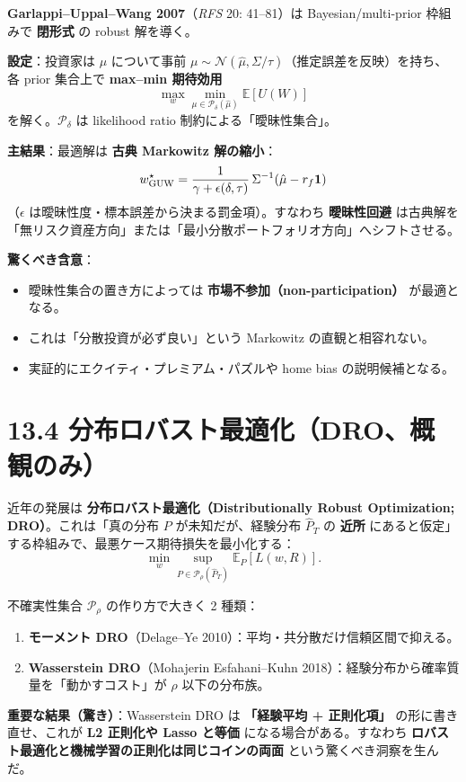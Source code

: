 \documentclass[11pt,a4paper]{report}
\begin{document}
\textbf{Garlappi–Uppal–Wang 2007}（\emph{RFS} 20: 41–81）は Bayesian/multi-prior 枠組みで \textbf{閉形式} の robust 解を導く。

\textbf{設定}：投資家は $\mu$ について事前 $\mu \sim \mathcal{N}(\hat\mu, \Sigma/\tau)$（推定誤差を反映）を持ち、各 prior 集合上で \textbf{max–min 期待効用} \[ \max_w \min_{\mu \in \mathcal{P}_\delta(\hat\mu)} \mathbb{E}[U(W)] \] を解く。$\mathcal{P}_\delta$ は likelihood ratio 制約による「曖昧性集合」。

\textbf{主結果}：最適解は \textbf{古典 Markowitz 解の縮小}： \[ w_{\rm GUW}^\star = \frac{1}{\gamma + \epsilon(\delta, \tau)}\, \Sigma^{-1}(\hat\mu - r_f \mathbf{1}) \] （$\epsilon$ は曖昧性度・標本誤差から決まる罰金項）。すなわち \textbf{曖昧性回避} は古典解を「無リスク資産方向」または「最小分散ポートフォリオ方向」へシフトさせる。

\textbf{驚くべき含意}：
\begin{itemize}
\item 曖昧性集合の置き方によっては \textbf{市場不参加（non-participation）} が最適となる。
\item これは「分散投資が必ず良い」という Markowitz の直観と相容れない。
\item 実証的にエクイティ・プレミアム・パズルや home bias の説明候補となる。
\end{itemize}

\section{13.4 分布ロバスト最適化（DRO、概観のみ）}

近年の発展は \textbf{分布ロバスト最適化（Distributionally Robust Optimization; DRO）}。これは「真の分布 $P$ が未知だが、経験分布 $\hat P_T$ の \textbf{近所} にあると仮定」する枠組みで、最悪ケース期待損失を最小化する： \[ \min_w \sup_{P \in \mathcal{P}_\rho(\hat P_T)} \mathbb{E}_P[L(w, R)]. \]

不確実性集合 $\mathcal{P}_\rho$ の作り方で大きく 2 種類：

\begin{enumerate}
\item \textbf{モーメント DRO}（Delage–Ye 2010）：平均・共分散だけ信頼区間で抑える。
\item \textbf{Wasserstein DRO}（Mohajerin Esfahani–Kuhn 2018）：経験分布から確率質量を「動かすコスト」が $\rho$ 以下の分布族。
\end{enumerate}

\textbf{重要な結果（驚き）}：Wasserstein DRO は \textbf{「経験平均 + 正則化項」} の形に書き直せ、これが \textbf{L2 正則化や Lasso と等価} になる場合がある。すなわち \textbf{ロバスト最適化と機械学習の正則化は同じコインの両面} という驚くべき洞察を生んだ。
\end{document}
